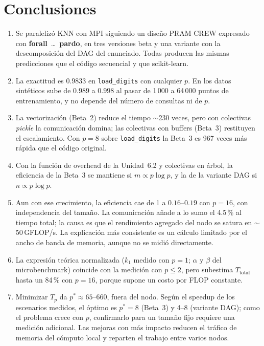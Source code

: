 \documentclass[11pt,a4paper]{article}
\newcommand{\ntr}{n}   %
\newcommand{\mte}{m}   %
\newcommand{\Ttot}{T_{\text{total}}}
\begin{document}
\section{Conclusiones}
\begin{enumerate}
  \item Se paralelizó KNN con MPI siguiendo un diseño PRAM CREW expresado con
        \textbf{forall}~\ldots~\textbf{pardo}, en tres versiones beta y una variante con la
        descomposición del DAG del enunciado. Todas producen las mismas predicciones que el código
        secuencial y que scikit-learn.
  \item La exactitud es $0.9833$ en \texttt{load\_digits} con cualquier $p$. En los datos
        sintéticos sube de $0.989$ a $0.998$ al pasar de 1\,000 a 64\,000 puntos de entrenamiento,
        y no depende del número de consultas ni de $p$.
  \item La vectorización (Beta~2) reduce el tiempo $\sim$230 veces, pero con colectivas
        \emph{pickle} la comunicación domina; las colectivas con buffers (Beta~3) restituyen el
        escalamiento. Con $p=8$ sobre \texttt{load\_digits} la Beta~3 es 967 veces más rápida que el
        código original.
  \item Con la función de overhead de la Unidad~6.2 y colectivas en árbol, la eficiencia de la
        Beta~3 se mantiene si $\mte\propto p\log p$, y la de la variante DAG si $\ntr\propto p\log p$.
  \item Aun con ese crecimiento, la eficiencia cae de 1 a $0.16$--$0.19$ con $p=16$, con
        independencia del tamaño. La comunicación añade a lo sumo el 4.5\,\% al tiempo total; la
        causa es que el rendimiento agregado del nodo se satura en $\sim$50\,GFLOP/s. La explicación
        más consistente es un cálculo limitado por el ancho de banda de memoria, aunque no se midió
        directamente.
  \item La expresión teórica normalizada ($k_1$ medido con $p=1$; $\alpha$ y $\beta$ del
        microbenchmark) coincide con la medición con $p\le2$, pero subestima $\Ttot$ hasta un 84\,\%
        con $p=16$, porque supone un costo por FLOP constante.
  \item Minimizar $T_p$ da $p^*\approx65$--$660$, fuera del nodo. Según el speedup de los escenarios
        medidos, el óptimo es $p^*=8$ (Beta~3) y 4--8 (variante DAG); como el problema crece con $p$,
        confirmarlo para un tamaño fijo requiere una medición adicional. Las mejoras con más impacto
        reducen el tráfico de memoria del cómputo local y reparten el trabajo entre varios nodos.
\end{enumerate}
\end{document}
